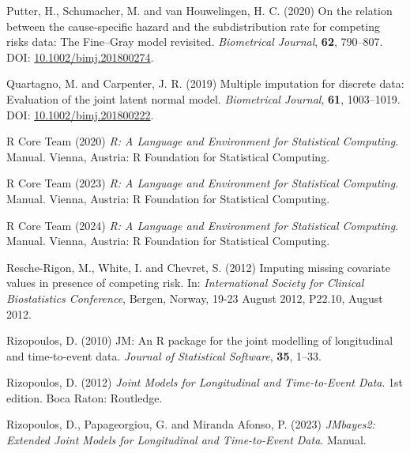 \documentclass[
  letterpaper,
  DIV=11,
  numbers=noendperiod]{scrreprt}
\newlength{\cslhangindent}
\newenvironment{CSLReferences}[2] %
 {\begin{list}{}{%
  \setlength{\itemindent}{0pt}
  \setlength{\leftmargin}{0pt}
  \setlength{\parsep}{0pt}
  \ifodd #1
   \setlength{\leftmargin}{\cslhangindent}
   \setlength{\itemindent}{-1\cslhangindent}
  \fi
  \setlength{\itemsep}{#2\baselineskip}}}
 {\end{list}}
\begin{document}
\begin{CSLReferences}{1}{1}
Putter, H., Schumacher, M. and van Houwelingen, H. C. (2020) On the
relation between the cause-specific hazard and the subdistribution rate
for competing risks data: {The Fine}--{Gray} model revisited.
\emph{Biometrical Journal}, \textbf{62}, 790--807. DOI:
\href{https://doi.org/10.1002/bimj.201800274}{10.1002/bimj.201800274}.

Quartagno, M. and Carpenter, J. R. (2019) Multiple imputation for
discrete data: {Evaluation} of the joint latent normal model.
\emph{Biometrical Journal}, \textbf{61}, 1003--1019. DOI:
\href{https://doi.org/10.1002/bimj.201800222}{10.1002/bimj.201800222}.

R Core Team (2020) \emph{R: {A} Language and Environment for Statistical
Computing}. Manual. Vienna, Austria: R Foundation for Statistical
Computing.

R Core Team (2023) \emph{R: {A} Language and Environment for Statistical
Computing}. Manual. Vienna, Austria: R Foundation for Statistical
Computing.

R Core Team (2024) \emph{R: A Language and Environment for Statistical
Computing}. Manual. Vienna, Austria: R Foundation for Statistical
Computing.

Resche-Rigon, M., White, I. and Chevret, S. (2012) Imputing missing
covariate values in presence of competing risk. In: \emph{International
{Society} for {Clinical Biostatistics Conference}}, Bergen, Norway,
19-23 August 2012, P22.10, August 2012.

Rizopoulos, D. (2010) {JM}: {An R} package for the joint modelling of
longitudinal and time-to-event data. \emph{Journal of Statistical
Software}, \textbf{35}, 1--33.

Rizopoulos, D. (2012) \emph{Joint {Models} for {Longitudinal} and
{Time-to-Event Data}}. 1st edition. Boca Raton: Routledge.

Rizopoulos, D., Papageorgiou, G. and Miranda Afonso, P. (2023)
\emph{{JMbayes2}: {Extended} Joint Models for Longitudinal and
Time-to-Event Data}. Manual.


\end{CSLReferences}
\end{document}
